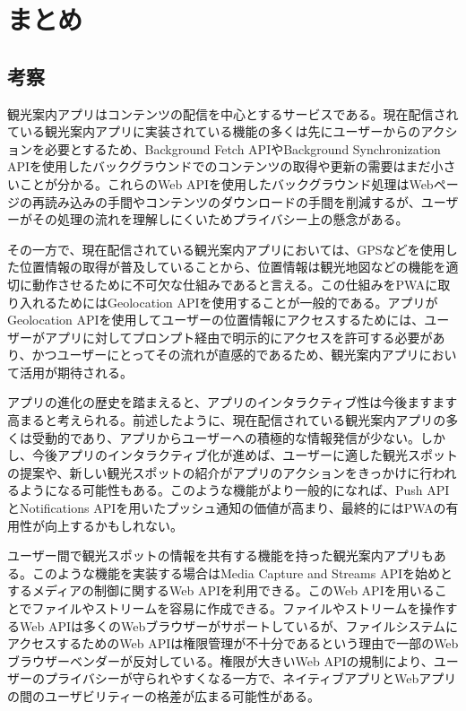 \section{まとめ}
\label{section:まとめ}
\subsection{考察}
\label{subsection:考察}
観光案内アプリはコンテンツの配信を中心とするサービスである。現在配信されている観光案内アプリに実装されている機能の多くは先にユーザーからのアクションを必要とするため、Background Fetch APIやBackground Synchronization APIを使用したバックグラウンドでのコンテンツの取得や更新の需要はまだ小さいことが分かる。これらのWeb APIを使用したバックグラウンド処理はWebページの再読み込みの手間やコンテンツのダウンロードの手間を削減するが、ユーザーがその処理の流れを理解しにくいためプライバシー上の懸念がある。

その一方で、現在配信されている観光案内アプリにおいては、GPSなどを使用した位置情報の取得が普及していることから、位置情報は観光地図などの機能を適切に動作させるために不可欠な仕組みであると言える。この仕組みをPWAに取り入れるためにはGeolocation APIを使用することが一般的である。アプリがGeolocation APIを使用してユーザーの位置情報にアクセスするためには、ユーザーがアプリに対してプロンプト経由で明示的にアクセスを許可する必要があり、かつユーザーにとってその流れが直感的であるため、観光案内アプリにおいて活用が期待される。

アプリの進化の歴史を踏まえると、アプリのインタラクティブ性は今後ますます高まると考えられる。前述したように、現在配信されている観光案内アプリの多くは受動的であり、アプリからユーザーへの積極的な情報発信が少ない。しかし、今後アプリのインタラクティブ化が進めば、ユーザーに適した観光スポットの提案や、新しい観光スポットの紹介がアプリのアクションをきっかけに行われるようになる可能性もある。このような機能がより一般的になれば、Push APIとNotifications APIを用いたプッシュ通知の価値が高まり、最終的にはPWAの有用性が向上するかもしれない。

ユーザー間で観光スポットの情報を共有する機能を持った観光案内アプリもある。このような機能を実装する場合はMedia Capture and Streams APIを始めとするメディアの制御に関するWeb APIを利用できる。このWeb APIを用いることでファイルやストリームを容易に作成できる。ファイルやストリームを操作するWeb APIは多くのWebブラウザーがサポートしているが、ファイルシステムにアクセスするためのWeb APIは権限管理が不十分であるという理由で一部のWebブラウザーベンダーが反対している。権限が大きいWeb APIの規制により、ユーザーのプライバシーが守られやすくなる一方で、ネイティブアプリとWebアプリの間のユーザビリティーの格差が広まる可能性がある。

